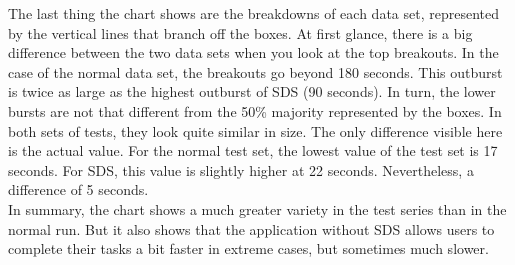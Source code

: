 The last thing the chart shows are the breakdowns of each data set, represented by the vertical lines that branch off the boxes. At first glance, there is a big difference between the two data sets when you look at the top breakouts. In the case of the normal data set, the breakouts go beyond 180 seconds. This outburst is twice as large as the highest outburst of \ac{SDS} (90 seconds). In turn, the lower bursts are not that different from the 50\% majority represented by the boxes. In both sets of tests, they look quite similar in size. The only difference visible here is the actual value. For the normal test set, the lowest value of the test set is 17 seconds. For \ac{SDS}, this value is slightly higher at 22 seconds. Nevertheless, a difference of 5 seconds. \\
In summary, the chart shows a much greater variety in the test series than in the normal run. But it also shows that the application without SDS allows users to complete their tasks a bit faster in extreme cases, but sometimes much slower. 